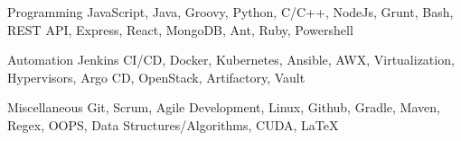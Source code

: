 

\begin{cvskills}

  \cvskill
    {Programming} %
    {JavaScript, Java, Groovy, Python, C/C++, NodeJs, Grunt, Bash, REST API, Express, React, MongoDB, Ant, Ruby, Powershell} %

  \cvskill
    {Automation} %
    {Jenkins CI/CD, Docker, Kubernetes, Ansible, AWX, Virtualization, Hypervisors, Argo CD, OpenStack, Artifactory, Vault} %

  \cvskill
    {Miscellaneous} %
    {Git, Scrum, Agile Development, Linux, Github, Gradle, Maven, Regex, OOPS, Data Structures/Algorithms, CUDA, \LaTeX} %

\end{cvskills}
